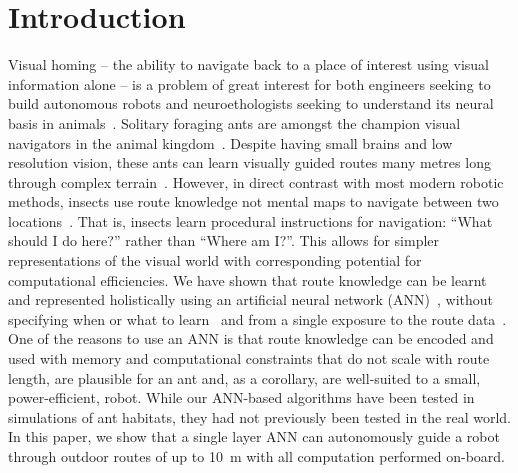 \documentclass[letterpaper]{article}
\begin{document}
\section{Introduction}
Visual homing -- the ability to navigate back to a place of interest using visual information alone -- is a problem of great interest for both engineers seeking to build autonomous robots and neuroethologists seeking to understand its neural basis in animals~\citep{Graham2014}.
Solitary foraging ants are amongst the champion visual navigators in the animal kingdom~\citep{Wehner2009}.
Despite having small brains and low resolution vision, these ants can learn visually guided routes many metres long through complex terrain~\citep{Knaden2016}.
However, in direct contrast with most modern robotic methods,  insects use route knowledge not mental maps to navigate between two locations~\citep{Wehner2006}. 
That is, insects learn procedural instructions for navigation: ``What should I do here?'' rather than ``Where am I?''. 
This allows for simpler representations of the visual world with corresponding potential for computational efficiencies.
We have shown that route knowledge can be learnt and represented holistically using an artificial neural network (ANN)~\citep{Philippides2015}, without specifying when or what to learn~\citep{Baddeley2011} and from a single exposure to the route data~\citep{Baddeley2012}. 
One of the reasons to use an ANN is that route knowledge can be encoded and used with memory and computational constraints that do not scale with route length, are plausible for an ant and, as a corollary, are well-suited to a small, power-efficient, robot.
While our ANN-based algorithms have been tested in simulations of ant habitats, they had not previously been tested in the real world.
In this paper, we show that a single layer ANN can autonomously guide a robot through outdoor routes of up to \SI{10}{\metre} with all computation performed on-board.
\end{document}
